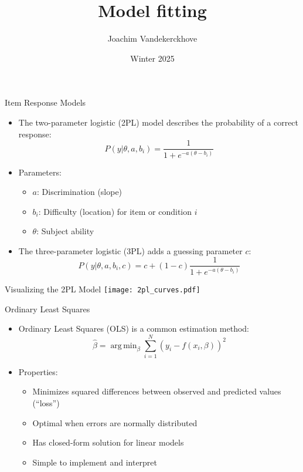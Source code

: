 \documentclass[aspectratio=169]{beamer}
\title{Model fitting}
\author{Joachim Vandekerckhove}
\date{Winter 2025}
\DeclareMathOperator*{\argmin}{arg\,min}
\begin{document}
\frame{\titlepage}

\begin{frame}{Item Response Models}
  \begin{itemize}[<+->]
    \item The two-parameter logistic (2PL) model describes the probability of a correct response:
    \begin{equation}
      P(y|\theta,a,b_i) = \frac{1}{1 + e^{-a(\theta - b_i)}}
    \end{equation}
    \item Parameters:
    \begin{itemize}[<+->]
      \item $a$: Discrimination (slope)
      \item $b_i$: Difficulty (location) for item or condition $i$
      \item $\theta$: Subject ability
    \end{itemize}
    \item The three-parameter logistic (3PL) adds a guessing parameter $c$:
    \begin{equation}
      P(y|\theta,a,b_i,c) = c + (1-c)\frac{1}{1 + e^{-a(\theta - b_i)}}
    \end{equation}
  \end{itemize}
\end{frame}

\begin{frame}{Visualizing the 2PL Model}
  \centering
  \texttt{[image: 2pl\_curves.pdf]}
\end{frame}

\begin{frame}{Ordinary Least Squares}
  \begin{itemize}[<+->]
    \item Ordinary Least Squares (OLS) is a common estimation method:
    \begin{equation}
      \hat{\beta} = \argmin_{\beta} \sum_{i=1}^{N} (y_i - f(x_i,\beta))^2
    \end{equation}
    \item Properties:
    \begin{itemize}[<+->]
      \item Minimizes squared differences between observed and predicted values (``loss'')
      \item Optimal when errors are normally distributed
      \item Has closed-form solution for linear models
      \item Simple to implement and interpret
    \end{itemize}
  \end{itemize}
\end{frame}
\end{document}
